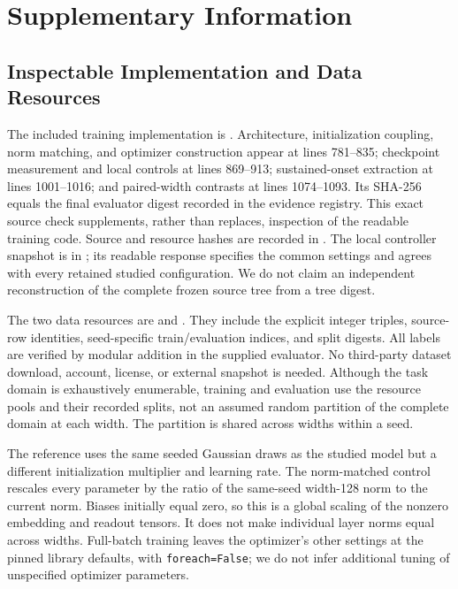 \documentclass{article}
\begin{document}
\FloatBarrier
\clearpage


\clearpage
\appendix
\section{Supplementary Information}

\subsection{Inspectable Implementation and Data Resources}
\label{sec:source}
The included training implementation is . Architecture, initialization coupling, norm matching, and optimizer construction appear at lines 781--835; checkpoint measurement and local controls at lines 869--913; sustained-onset extraction at lines 1001--1016; and paired-width contrasts at lines 1074--1093. Its SHA-256 equals the final evaluator digest recorded in the evidence registry. This exact source check supplements, rather than replaces, inspection of the readable training code. Source and resource hashes are recorded in . The local controller snapshot is in ; its readable response specifies the common settings and agrees with every retained studied configuration. We do not claim an independent reconstruction of the complete frozen source tree from a tree digest.

The two data resources are  and . They include the explicit integer triples, source-row identities, seed-specific train/evaluation indices, and split digests. All labels are verified by modular addition in the supplied evaluator. No third-party dataset download, account, license, or external snapshot is needed. Although the task domain is exhaustively enumerable, training and evaluation use the resource pools and their recorded splits, not an assumed random partition of the complete domain at each width. The partition is shared across widths within a seed.

The reference uses the same seeded Gaussian draws as the studied model but a different initialization multiplier and learning rate. The norm-matched control rescales every parameter by the ratio of the same-seed width-128 norm to the current norm. Biases initially equal zero, so this is a global scaling of the nonzero embedding and readout tensors. It does not make individual layer norms equal across widths. Full-batch training leaves the optimizer's other settings at the pinned library defaults, with \texttt{foreach=False}; we do not infer additional tuning of unspecified optimizer parameters.
\end{document}

